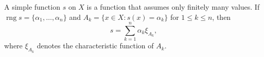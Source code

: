 A simple function $s$ on $X$ is a function that assumes only finitely many values. If $\operatorname{rng} s = \{\alpha_1, \ldots, \alpha_n\}$ and $A_k = \{x \in X : s(x) = \alpha_k\}$ for $1 \leq k \leq n$, then
$$s = \sum_{k=1}^{n} \alpha_k \xi_{A_k},$$
where $\xi_{A_k}$ denotes the characteristic function of $A_k$.